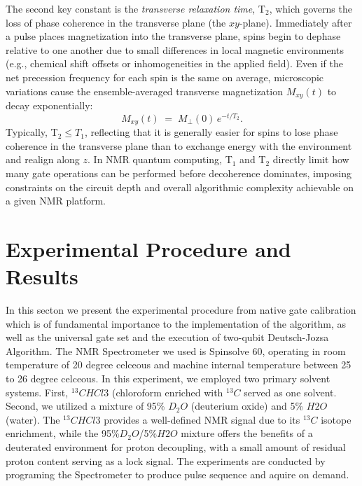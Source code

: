 \documentclass[%
 reprint,
 amsmath,amssymb,
 aps,
]{revtex4-2}
\begin{document}
The second key constant is the \emph{transverse relaxation time}, T$_2$, which governs the loss of phase coherence in the transverse plane (the $xy$-plane). Immediately after a pulse places magnetization into the transverse plane, spins begin to dephase relative to one another due to small differences in local magnetic environments (e.g., chemical shift offsets or inhomogeneities in the applied field). Even if the net precession frequency for each spin is the same on average, microscopic variations cause the ensemble-averaged transverse magnetization $M_{xy}(t)$ to decay exponentially:
\[
M_{xy}(t) \;=\; M_{\perp}(0)\,e^{-t/T_2}.
\]
Typically, T$_2 \leq T_1$, reflecting that it is generally easier for spins to lose phase coherence in the transverse plane than to exchange energy with the environment and realign along $z$. In NMR quantum computing, T$_1$ and T$_2$ directly limit how many gate operations can be performed before decoherence dominates, imposing constraints on the circuit depth and overall algorithmic complexity achievable on a given NMR platform.

\section{Experimental Procedure and Results}
In this secton we present the experimental procedure from native gate calibration which is of fundamental importance to the implementation of the algorithm, as well as the universal gate set and the execution of two-qubit Deutsch-Jozsa Algorithm. 
The NMR Spectrometer we used is Spinsolve 60, operating in room temperature of 20 degree celceous and machine internal temperature between 25 to 26 degree celceous. 
In this experiment, we employed two primary solvent systems. First, ${}^{13}CHCl3$ (chloroform enriched with ${}^{13}C$ served as one solvent. Second, we utilized a mixture of 95\% $D_2O$ (deuterium oxide) and 5\% $H2O$ (water). The ${}^{13}CHCl3$ provides a well-defined NMR signal due to its ${}^{13}C$ isotope enrichment, while the 95\%$D_2O$/5\%$H2O$ mixture offers the benefits of a deuterated environment for proton decoupling, with a small amount of residual proton content serving as a lock signal.
The experiments are conducted by programing the Spectrometer to produce pulse sequence and aquire on demand.
\end{document}
